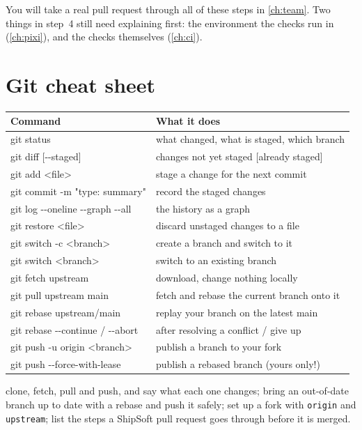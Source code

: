 You will take a real pull request through all of these steps in
\cref{ch:team}. Two things in step~4 still need explaining first: the
environment the checks run in (\cref{ch:pixi}), and the checks themselves
(\cref{ch:ci}).

\section{Git cheat sheet}
\label{sec:gitcheatsheet}

\begin{center}\small
\begin{tabularx}{\linewidth}{>{\ttfamily}l L}
\toprule
\normalfont\bfseries Command & \bfseries What it does \\
\midrule
git status                    & what changed, what is staged, which branch \\
git diff [-{}-staged]         & changes not yet staged [already staged] \\
git add <file>                & stage a change for the next commit \\
git commit -m "type: summary" & record the staged changes \\
git log -{}-oneline -{}-graph -{}-all & the history as a graph \\
git restore <file>            & discard unstaged changes to a file \\
git switch -c <branch>        & create a branch and switch to it \\
git switch <branch>           & switch to an existing branch \\
git fetch upstream            & download, change nothing locally \\
git pull upstream main        & fetch and rebase the current branch onto it \\
git rebase upstream/main      & replay your branch on the latest main \\
git rebase -{}-continue / -{}-abort & after resolving a conflict / give up \\
git push -u origin <branch>   & publish a branch to your fork \\
git push -{}-force-with-lease & publish a rebased branch (yours only!) \\
\bottomrule
\end{tabularx}
\end{center}

\begin{levelcheck}
\begin{itemize}
  \can clone, fetch, pull and push, and say what each one changes;
  \can bring an out-of-date branch up to date with a rebase and push it
       safely;
  \can set up a fork with \texttt{origin} and \texttt{upstream};
  \can list the steps a ShipSoft pull request goes through before it is
       merged.
\end{itemize}
\end{levelcheck}

